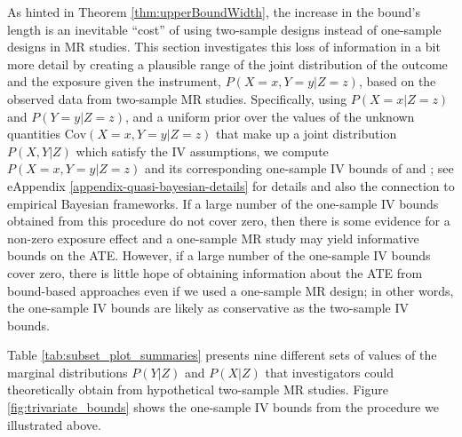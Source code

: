 \documentclass[
]{article}
\theoremstyle{plain}
\begin{document}
As hinted in Theorem \ref{thm:upperBoundWidth}, the increase in the bound's length is an inevitable ``cost'' of using two-sample designs instead of one-sample designs in MR studies. This section investigates this loss of information in a bit more detail by creating a plausible range of the joint distribution of the outcome and the exposure given the instrument, \(P(X = x, Y = y | Z = z)\), based on the observed data from two-sample MR studies. Specifically, using \(P(X = x | Z = z)\) and \(P(Y = y | Z = z)\), and a uniform prior over the values of the unknown quantities \(\text{Cov}(X = x, Y = y | Z = z)\) that make up a joint distribution \(P(X, Y | Z)\) which satisfy the IV assumptions, we compute \(P(X = x, Y = y | Z = z)\) and its corresponding one-sample IV bounds of \textcite{balke_bounds_1997} and \textcite{richardson_ace_2014}; see eAppendix \ref{appendix-quasi-bayesian-details} for details and also the connection to empirical Bayesian frameworks. If a large number of the one-sample IV bounds obtained from this procedure do not cover zero, then there is some evidence for a non-zero exposure effect and a one-sample MR study may yield informative bounds on the ATE. However, if a large number of the one-sample IV bounds cover zero, there is little hope of obtaining information about the ATE from bound-based approaches even if we used a one-sample MR design; in other words, the one-sample IV bounds are likely as conservative as the two-sample IV bounds.

Table \ref{tab:subset_plot_summaries} presents nine different sets of values of the marginal distributions \(P(Y | Z)\) and \(P(X | Z)\) that investigators could theoretically obtain from hypothetical two-sample MR studies. Figure \ref{fig:trivariate_bounds} shows the one-sample IV bounds from the procedure we illustrated above.
\end{document}
